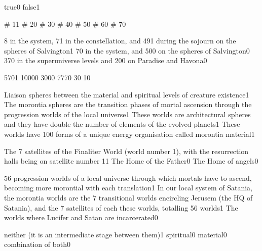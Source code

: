 {true}{0}
{false}{1}
\qstop


{\# 1}{1}
{\# 2}{0}
{\# 3}{0}
{\# 4}{0}
{\# 5}{0}
{\# 6}{0}
{\# 7}{0}
\qstop


{8 in the system, 71 in the constellation, and 491 during the sojourn on the spheres of Salvington}{1}
{70 in the system, and 500 on the spheres of Salvington}{0}
{370 in the superuniverse levels and 200 on Paradise and Havona}{0}
\qstop

{570}{1}
{1000}{0}
{300}{0}
{777}{0}
{3}{0}
{1}{0}
\qstop

{Liaison spheres between the material and spiritual levels of creature existence}{1}
{The morontia spheres are the transition phases of mortal ascension through the progression worlds of the local universe}{1}
{These worlds are architectural spheres and they have double the number of elements of the evolved planets}{1}
{These worlds have 100 forms of a unique energy organisation called morontia material}{1}
\qstop

{The 7 satellites of the Finaliter World (world number 1), with the resurrection halls being on satellite number 1}{1}
{The Home of the Father}{0}
{The Home of angels}{0}
\qstop

{56 progression worlds of a local universe through which mortals have to ascend, becoming more morontial with each translation}{1}
{In our local system of Satania, the morontia worlds are the 7 transitional worlds encircling Jerusem (the HQ of Satania), and the 7 satellites of each these worlds, totalling 56 worlds}{1}
{The worlds where Lucifer and Satan are incarcerated}{0}
\qstop

{neither (it is an intermediate stage between them)}{1}
{spiritual}{0}
{material}{0}
{combination of both}{0}
\qstop



